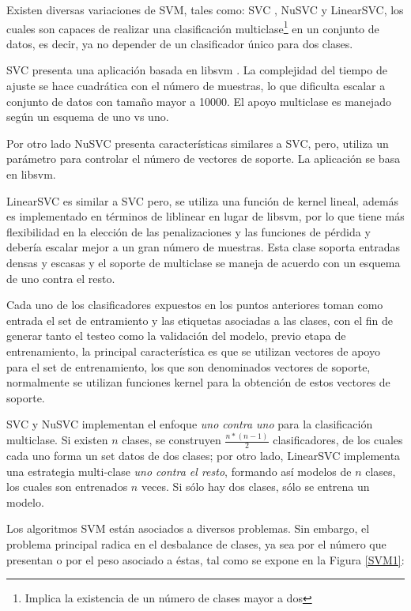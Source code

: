 Existen diversas variaciones de SVM, tales como: SVC \cite{guyon1993automatic}, NuSVC y LinearSVC, los cuales son capaces de realizar una clasificación multiclase\footnote{Implica la existencia de un número de clases mayor a dos} en un conjunto de datos, es decir, ya no depender de un clasificador único para dos clases.

SVC presenta una aplicación basada en libsvm \cite{chang2011libsvm}. La complejidad del tiempo de ajuste se hace cuadrática con el número de muestras, lo que dificulta escalar a conjunto de datos con tamaño mayor a 10000. El apoyo multiclase es manejado según un esquema de uno vs uno.

Por otro lado NuSVC presenta características similares a SVC, pero, utiliza un parámetro para controlar el número de vectores de soporte. La aplicación se basa en libsvm.

LinearSVC es similar a SVC pero, se utiliza una función de kernel lineal, además es implementado en términos de liblinear en lugar de libsvm, por lo que tiene más flexibilidad en la elección de las penalizaciones y las funciones de pérdida y debería escalar mejor a un gran número de muestras.
Esta clase soporta entradas densas y escasas y el soporte de multiclase se maneja de acuerdo con un
esquema de uno contra el resto.

Cada uno de los clasificadores expuestos en los puntos anteriores toman como entrada el set de entramiento y las etiquetas asociadas a las clases, con el fin de generar tanto el testeo como la validación del modelo, previo etapa de entrenamiento, la principal característica es que se utilizan vectores de apoyo para el set de entrenamiento, los que son denominados vectores de soporte, normalmente se utilizan funciones kernel para la obtención de estos vectores de soporte.

SVC y NuSVC implementan el enfoque \textit{uno contra uno} para la clasificación multiclase. Si existen $n$ clases, se construyen $\frac{n*(n-1)}{2}$ clasificadores, de los cuales cada uno forma un set datos de dos clases; por otro lado, LinearSVC implementa una estrategia multi-clase \textit{uno contra el resto}, formando así modelos de $n$ clases, los cuales son entrenados $n$ veces. Si sólo hay dos clases, sólo se entrena un modelo.

Los algoritmos SVM están asociados a diversos problemas. Sin embargo, el problema principal radica en el desbalance de clases, ya sea por el número que presentan o por el peso asociado a éstas, tal como se expone en la Figura  \ref{SVM1}:

